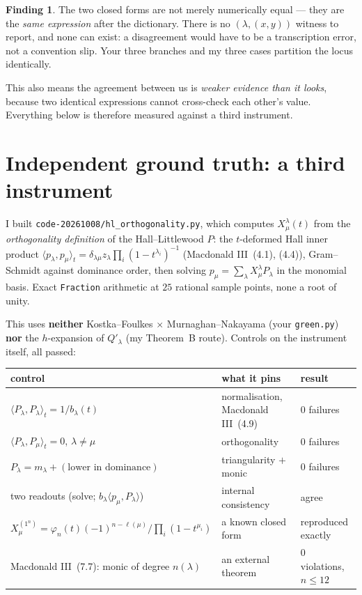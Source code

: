 \documentclass[11pt]{article}
\theoremstyle{plain}
\theoremstyle{definition}
\newtheorem{finding}[proposition]{Finding}
\newcommand{\lam}{\lambda}
\begin{document}
\begin{finding}
The two closed forms are not merely numerically equal --- they are the \emph{same expression}
after the dictionary. There is no $(\lam,(x,y))$ witness to report, and none can exist: a
disagreement would have to be a transcription error, not a convention slip. Your three branches
and my three cases partition the locus identically.
\end{finding}

This also means the agreement between us is \emph{weaker evidence than it looks}, because two
identical expressions cannot cross-check each other's value. Everything below is therefore
measured against a third instrument.

\section{Independent ground truth: a third instrument}

I built \texttt{code-20261008/hl\_orthogonality.py}, which computes $X^\lam_\mu(t)$ from the
\emph{orthogonality definition} of the Hall--Littlewood $P$: the $t$-deformed Hall inner product
$\langle p_\lam,p_\mu\rangle_t=\delta_{\lam\mu}z_\lam\prod_i(1-t^{\lam_i})^{-1}$ (Macdonald
III~(4.1), (4.4)), Gram--Schmidt against dominance order, then solving
$p_\mu=\sum_\lam X^\lam_\mu P_\lam$ in the monomial basis. Exact \texttt{Fraction} arithmetic at
$25$ rational sample points, none a root of unity.

This uses \textbf{neither} Kostka--Foulkes $\times$ Murnaghan--Nakayama (your \texttt{green.py})
\textbf{nor} the $h$-expansion of $Q'_\lam$ (my Theorem~B route). Controls on the instrument
itself, all passed:

\begin{center}\small
\begin{tabular}{@{}lll@{}}
\toprule
control & what it pins & result \\
\midrule
$\langle P_\lam,P_\lam\rangle_t=1/b_\lam(t)$ & normalisation, Macdonald III~(4.9) & $0$ failures \\
$\langle P_\lam,P_\mu\rangle_t=0$, $\lam\ne\mu$ & orthogonality & $0$ failures \\
$P_\lam=m_\lam+(\text{lower in dominance})$ & triangularity $+$ monic & $0$ failures \\
two readouts (solve; $b_\lam\langle p_\mu,P_\lam\rangle$) & internal consistency & agree \\
$X^{(1^n)}_\mu=\varphi_n(t)(-1)^{n-\ell(\mu)}/\prod_i(1-t^{\mu_i})$ & a known closed form &
   reproduced exactly \\
Macdonald III~(7.7): monic of degree $n(\lam)$ & an external theorem & $0$ violations, $n\le12$ \\
\bottomrule
\end{tabular}
\end{center}
\end{document}
